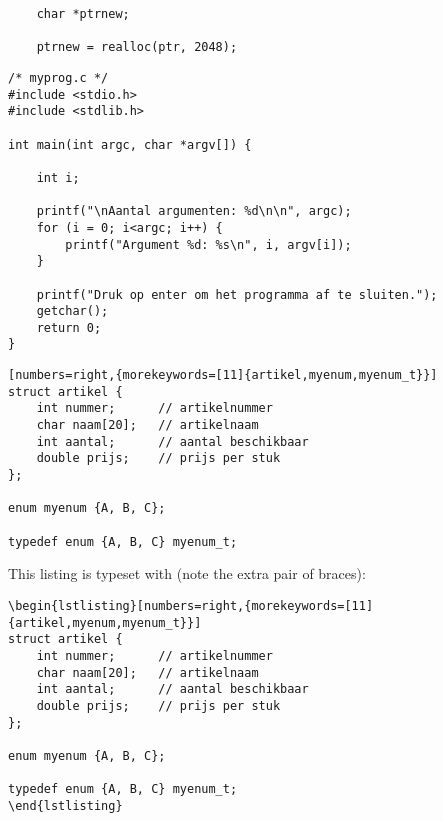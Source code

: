 \documentclass[a4paper,12pt]{article}
\begin{document}
\begin{lstlisting}
	char *ptrnew;

	ptrnew = realloc(ptr, 2048);
\end{lstlisting}

\newpage

\begin{lstlisting}
/* myprog.c */
#include <stdio.h>
#include <stdlib.h>

int main(int argc, char *argv[]) {

    int i;

    printf("\nAantal argumenten: %d\n\n", argc);
    for (i = 0; i<argc; i++) {
        printf("Argument %d: %s\n", i, argv[i]);
    }

    printf("Druk op enter om het programma af te sluiten.");
    getchar();
    return 0;
}
\end{lstlisting}

\newpage

\begin{lstlisting}[numbers=right,{morekeywords=[11]{artikel,myenum,myenum_t}}]
struct artikel {
	int nummer;      // artikelnummer
	char naam[20];   // artikelnaam
	int aantal;      // aantal beschikbaar
	double prijs;    // prijs per stuk
};

enum myenum {A, B, C};

typedef enum {A, B, C} myenum_t;
\end{lstlisting}


This listing is typeset with (note the extra pair of braces):

{\small
\begin{verbatim}
\begin{lstlisting}[numbers=right,{morekeywords=[11]{artikel,myenum,myenum_t}}]
struct artikel {
	int nummer;      // artikelnummer
	char naam[20];   // artikelnaam
	int aantal;      // aantal beschikbaar
	double prijs;    // prijs per stuk
};

enum myenum {A, B, C};

typedef enum {A, B, C} myenum_t;
\end{lstlisting}
\end{verbatim}
}
\newpage
\end{document}
